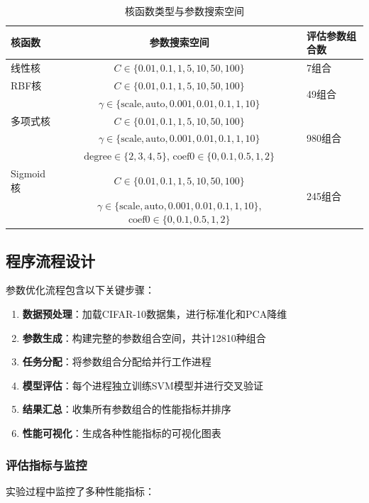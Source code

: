 \documentclass[UTF8]{report}
\theoremstyle{MyLineTheoremStyle} %
\theoremstyle{MyBlockTheoremStyle} %
\theoremstyle{MySubsubsectionStyle} %
\begin{document}
\begin{table}[h]
\centering
\caption{核函数类型与参数搜索空间}
\begin{tabular}{l c l}
\toprule
\textbf{核函数} & \textbf{参数搜索空间} & \textbf{评估参数组合数} \\
\midrule
线性核 & $C \in \{0.01, 0.1, 1, 5, 10, 50, 100\}$ & 7组合 \\
RBF核 & $C \in \{0.01, 0.1, 1, 5, 10, 50, 100\}$ & \multirow{2}{*}{49组合} \\
 & $\gamma \in \{\text{scale}, \text{auto}, 0.001, 0.01, 0.1, 1, 10\}$ & \\
多项式核 & $C \in \{0.01, 0.1, 1, 5, 10, 50, 100\}$ & \multirow{3}{*}{980组合} \\
 & $\gamma \in \{\text{scale}, \text{auto}, 0.001, 0.01, 0.1, 1, 10\}$ & \\
 & $\text{degree} \in \{2, 3, 4, 5\}$, $\text{coef0} \in \{0, 0.1, 0.5, 1, 2\}$ & \\
Sigmoid核 & $C \in \{0.01, 0.1, 1, 5, 10, 50, 100\}$ & \multirow{2}{*}{245组合} \\
 & $\gamma \in \{\text{scale}, \text{auto}, 0.001, 0.01, 0.1, 1, 10\}$, $\text{coef0} \in \{0, 0.1, 0.5, 1, 2\}$ & \\
\bottomrule
\end{tabular}
\end{table}
\subsection{程序流程设计}
参数优化流程包含以下关键步骤：

\begin{enumerate}[label=\arabic*.]
    \item \textbf{数据预处理}：加载CIFAR-10数据集，进行标准化和PCA降维
    \item \textbf{参数生成}：构建完整的参数组合空间，共计12810种组合
    \item \textbf{任务分配}：将参数组合分配给并行工作进程
    \item \textbf{模型评估}：每个进程独立训练SVM模型并进行交叉验证
    \item \textbf{结果汇总}：收集所有参数组合的性能指标并排序
    \item \textbf{性能可视化}：生成各种性能指标的可视化图表
\end{enumerate}

\subsubsection{评估指标与监控}
实验过程中监控了多种性能指标：
\end{document}
